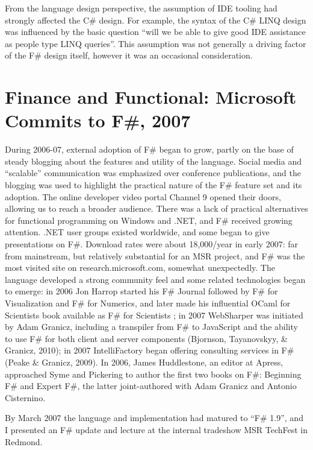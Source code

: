 \documentclass[acmsmall,review]{acmart}\settopmatter{printfolios=true,printccs=false,printacmref=false}
\begin{document}
From the language design perspective, the assumption of IDE tooling had strongly affected the C\# design.  For example, the syntax of the C\# LINQ design was influenced by the basic question “will we be able to give good IDE assistance as people type LINQ queries”.  This assumption was not generally a driving factor of the F\# design itself, however it was an occasional consideration.



\section*{Finance and Functional: Microsoft Commits to F\#, 2007}

During 2006-07, external adoption of F\# began to grow, partly on the base of steady blogging about the features and utility of the language.  Social media and “scalable” communication was emphasized over conference publications, and the blogging was used to highlight the practical nature of the F\# feature set and its adoption. The online developer video portal Channel 9 opened their doors, allowing us to reach a broader audience.  There was a lack of practical alternatives for functional programming on Windows and .NET, and F\# received growing attention. .NET user groups existed worldwide, and some began to give presentations on F\#. Download rates were about 18,000/year in early 2007: far from mainstream, but relatively substantial for an MSR project, and F\# was the most visited site on research.microsoft.com, somewhat unexpectedly. The language developed a strong community feel and some related technologies began to emerge: in 2006 Jon Harrop started his F\# Journal followed by F\# for Visualization and F\# for Numerics, and later made his influential OCaml for Scientists book available as F\# for Scientists ; in 2007 WebSharper was initiated by Adam Granicz, including a transpiler from F\# to JavaScript and the ability to use F\# for both client and server components (Bjornson, Tayanovskyy, \& Granicz, 2010); in 2007 IntelliFactory began offering consulting services in F\# (Peake \& Granicz, 2009).   In 2006, James Huddlestone, an editor at Apress, approached Syme and Pickering to author the first two books on F\#: Beginning F\# and Expert F\#, the latter joint-authored with Adam Granicz and Antonio Cisternino.    

By March 2007 the language and implementation had matured to “F\# 1.9”, and I presented an F\# update and lecture at the internal tradeshow MSR TechFest in Redmond.  
\end{document}
